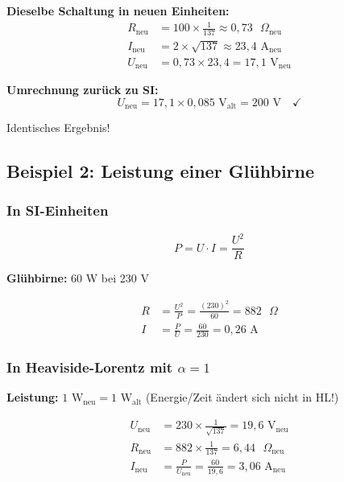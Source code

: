 	\textbf{Dieselbe Schaltung in neuen Einheiten:}
	\begin{align}
		R_{\text{neu}} &= 100 \times \frac{1}{137} \approx 0{,}73 \text{ }\Omega_{\text{neu}} \\
		I_{\text{neu}} &= 2 \times \sqrt{137} \approx 23{,}4 \text{ A}_{\text{neu}} \\
		U_{\text{neu}} &= 0{,}73 \times 23{,}4 = 17{,}1 \text{ V}_{\text{neu}}
	\end{align}
	
	\textbf{Umrechnung zurück zu SI:}
	\begin{equation}
		U_{\text{neu}} = 17{,}1 \times 0{,}085 \text{ V}_{\text{alt}} = 200 \text{ V} \quad \checkmark
	\end{equation}
	
	Identisches Ergebnis!
	
	\subsection{Beispiel 2: Leistung einer Glühbirne}
	
	\subsubsection{In SI-Einheiten}
	
	\begin{equation}
		P = U \cdot I = \frac{U^2}{R}
	\end{equation}
	
	\textbf{Glühbirne:} 60 W bei 230 V
	
	\begin{align}
		R &= \frac{U^2}{P} = \frac{(230)^2}{60} = 882 \text{ }\Omega \\
		I &= \frac{P}{U} = \frac{60}{230} = 0{,}26 \text{ A}
	\end{align}
	
	\subsubsection{In Heaviside-Lorentz mit $\alpha = 1$}
	
	\textbf{Leistung:} $1 \text{ W}_{\text{neu}} = 1 \text{ W}_{\text{alt}}$ (Energie/Zeit ändert sich nicht in HL!)
	
	\begin{align}
		U_{\text{neu}} &= 230 \times \frac{1}{\sqrt{137}} = 19{,}6 \text{ V}_{\text{neu}} \\
		R_{\text{neu}} &= 882 \times \frac{1}{137} = 6{,}44 \text{ }\Omega_{\text{neu}} \\
		I_{\text{neu}} &= \frac{P}{U_{\text{neu}}} = \frac{60}{19{,}6} = 3{,}06 \text{ A}_{\text{neu}}
	\end{align}
	
